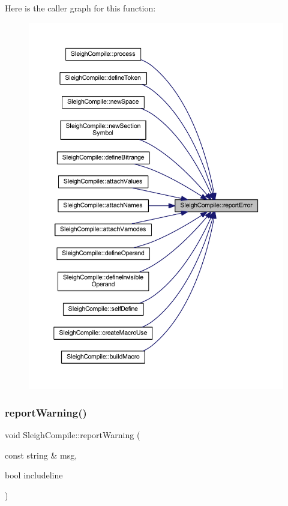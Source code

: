 Here is the caller graph for this function\+:
\nopagebreak
\begin{figure}[H]
\begin{center}
\leavevmode
\includegraphics[width=350pt]{class_sleigh_compile_a0ab2e290f1b8fcdeaa6e78d5d4e9e9ff_icgraph}
\end{center}
\end{figure}
\mbox{\label{class_sleigh_compile_af7bc0abd8fab8c9ec3feef83fa14cd54}} 
\subsubsection{\texorpdfstring{reportWarning()}{reportWarning()}}
{\footnotesize\ttfamily void Sleigh\+Compile\+::report\+Warning (\begin{DoxyParamCaption}\item[{const string \&}]{msg,  }\item[{bool}]{includeline }\end{DoxyParamCaption})}



